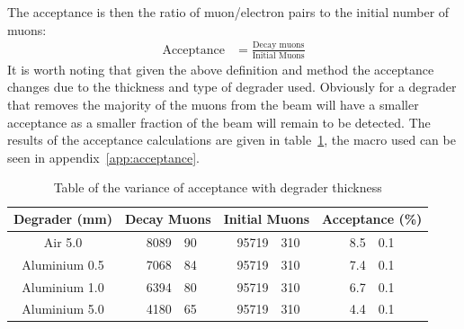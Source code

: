 \documentclass[]{article}
\begin{document}
The acceptance is then the ratio of muon/electron pairs to the initial number of muons:
\begin{align}
    \text{Acceptance} &= \frac{\text{Decay muons}}{\text{Initial Muons}} \label{equ:acceptance}
\end{align}
It is worth noting that given the above definition and method the acceptance changes due to the thickness and type of degrader used. Obviously for a degrader that removes the majority of the muons from the beam will have a smaller acceptance as a smaller fraction of the beam will remain to be detected. The results of the acceptance calculations are given in table~\ref{tab:acceptance}, the macro used can be seen in appendix~\ref{app:acceptance}.
\begin{table}
    \begin{center}
    \begin{tabular}{c| r@{ $\pm$ }l | r@{ $\pm$ }l | r@{ $\pm$ }l }
        Degrader (mm) & \multicolumn{2}{|c}{Decay Muons} & \multicolumn{2}{|c}{Initial Muons} & \multicolumn{2}{|c}{Acceptance (\%)}\\
        \hline
        Air 5.0       & 8089 & 90 & 95719 & 310 & 8.5 & 0.1 \\
        Aluminium 0.5 & 7068 & 84 & 95719 & 310 & 7.4 & 0.1 \\
        Aluminium 1.0 & 6394 & 80 & 95719 & 310 & 6.7 & 0.1 \\
        Aluminium 5.0 & 4180 & 65 & 95719 & 310 & 4.4 & 0.1 \\
    \end{tabular}
    \end{center}
    \caption{Table of the variance of acceptance with degrader thickness}
    \label{tab:acceptance}
\end{table}
\end{document}

